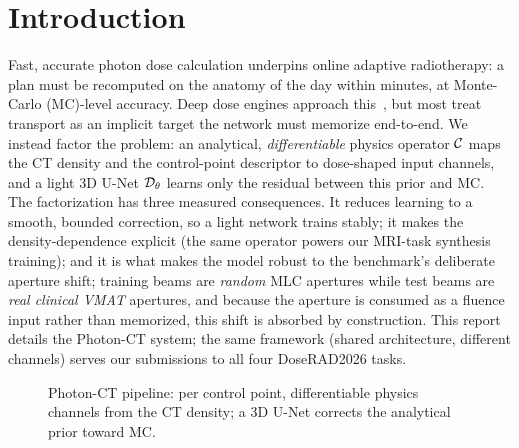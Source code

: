\documentclass{llncs}
\begin{document}
\section{Introduction}
Fast, accurate photon dose calculation underpins online adaptive radiotherapy: a plan must be
recomputed on the anatomy of the day within minutes, at Monte-Carlo (MC)-level accuracy. Deep
dose engines approach this~\cite{photonunet,dota}, but most treat transport as an implicit target
the network must memorize end-to-end. We instead factor the problem: an analytical,
\emph{differentiable} physics operator $\mathcal{C}$ maps the CT density and the control-point
descriptor to dose-shaped input channels, and a light 3D U-Net $\mathcal{D}_\theta$ learns only the
residual between this prior and MC. The factorization has three measured consequences. It
reduces learning to a smooth, bounded correction, so a light network trains stably; it makes the
density-dependence explicit (the same operator powers our MRI-task synthesis training); and it
is what makes the model robust to the benchmark's deliberate aperture shift; training beams are
\emph{random} MLC apertures while test beams are \emph{real clinical VMAT} apertures, and because
the aperture is consumed as a fluence input rather than memorized, this shift is absorbed by
construction. This report details the Photon-CT system; the same framework (shared architecture,
different channels) serves our submissions to all four DoseRAD2026 tasks.

\begin{figure}[t]\centering
{}
\caption{Photon-CT pipeline: per control point, differentiable physics channels from the CT
density; a 3D U-Net corrects the analytical prior toward MC.}\label{fig:framework}
\end{figure}
\end{document}
